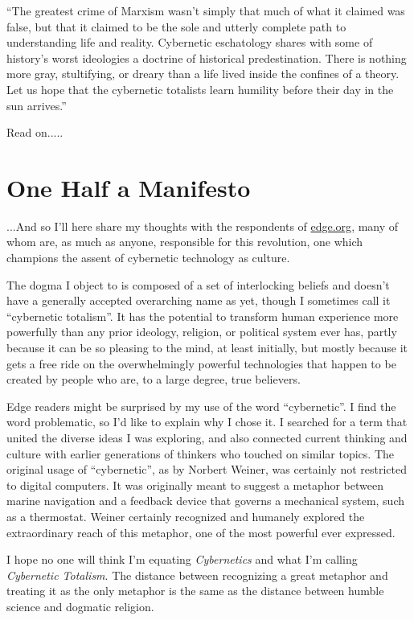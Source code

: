 \documentclass[letterpaper,12pt,english]{sphinxmanual}
\begin{document}
``The greatest crime of Marxism wasn't simply that much of what it claimed was false, but that it claimed to be the sole and utterly complete path to understanding life and reality. Cybernetic eschatology shares with some of history's worst ideologies a doctrine of historical predestination. There is nothing more gray, stultifying, or dreary than a life lived inside the confines of a theory. Let us hope that the cybernetic totalists learn humility before their day in the sun arrives.''

Read on.....


\section{One Half a Manifesto}
\label{lanier:one-half-a-manifesto}
...And so I'll here share my thoughts with the respondents of \href{http://edge.org}{edge.org}, many of whom are, as much as anyone, responsible for this revolution, one which champions the assent of cybernetic technology as culture.

The dogma I object to is composed of a set of interlocking beliefs and doesn't have a generally accepted overarching name as yet, though I sometimes call it ``cybernetic totalism''. It has the potential to transform human experience more powerfully than any prior ideology, religion, or political system ever has, partly because it can be so pleasing to the mind, at least initially, but mostly because it gets a free ride on the overwhelmingly powerful technologies that happen to be created by people who are, to a large degree, true believers.

Edge readers might be surprised by my use of the word ``cybernetic''. I find the word problematic, so I'd like to explain why I chose it. I searched for a term that united the diverse ideas I was exploring, and also connected current thinking and culture with earlier generations of thinkers who touched on similar topics. The original usage of ``cybernetic'', as by Norbert Weiner, was certainly not restricted to digital computers. It was originally meant to suggest a metaphor between marine navigation and a feedback device that governs a mechanical system, such as a thermostat. Weiner certainly recognized and humanely explored the extraordinary reach of this metaphor, one of the most powerful ever expressed.

I hope no one will think I'm equating \emph{Cybernetics} and what I'm calling \emph{Cybernetic Totalism}. The distance between recognizing a great metaphor and treating it as the only metaphor is the same as the distance between humble science and dogmatic religion.
\end{document}
